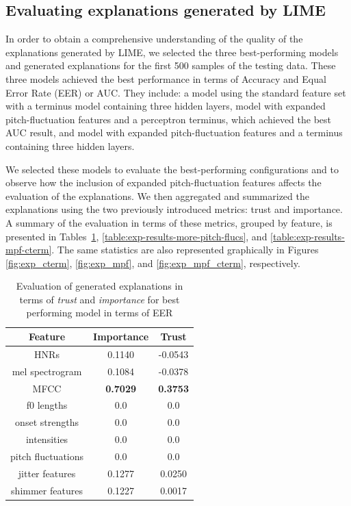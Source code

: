 \documentclass{article}
\begin{document}
            
\subsection{Evaluating explanations generated by LIME}
In order to obtain a comprehensive understanding of the quality of the explanations generated by LIME, we selected the three best-performing models and generated explanations for the first 500 samples of the testing data. These three models achieved the best performance in terms of Accuracy and Equal Error Rate (EER) or AUC. They include: a model using the standard feature set with a terminus model containing three hidden layers, model with expanded pitch-fluctuation features and a perceptron terminus, which achieved the best AUC result, and model with expanded pitch-fluctuation features and a terminus containing three hidden layers.

We selected these models to evaluate the best-performing configurations and to observe how the inclusion of expanded pitch-fluctuation features affects the evaluation of the explanations. We then aggregated and summarized the explanations using the two previously introduced metrics: trust and importance. A summary of the evaluation in terms of these metrics, grouped by feature, is presented in Tables~\ref{table:exp-results-cterm}, \ref{table:exp-results-more-pitch-flucs}, and \ref{table:exp-results-mpf-cterm}. The same statistics are also represented graphically in Figures \ref{fig:exp_cterm}, \ref{fig:exp_mpf}, and \ref{fig:exp_mpf_cterm}, respectively.
\begin{table}[htbp]
	\caption{Evaluation of generated explanations in terms of \textit{trust} and \textit{importance} for best performing model in terms of EER}
			\vspace{10pt}
			\centering
			\begin{tabular}{|c | c | c|}
				\hline
				\textbf{Feature} & \textbf{Importance} & \textbf{Trust} \\
				\hline
				HNRs & 0.1140 & -0.0543 \\  \hline
				mel spectrogram & 0.1084 & -0.0378 \\ \hline
				MFCC & \textbf{0.7029} & \textbf{0.3753} \\ \hline
				f0 lengths & 0.0 & 0.0 \\ \hline
				onset strengths & 0.0 & 0.0 \\ \hline
				intensities & 0.0 & 0.0 \\ \hline
				pitch fluctuations & 0.0 & 0.0 \\ \hline
				jitter features & 0.1277 & 0.0250 \\ \hline
				shimmer features & 0.1227 & 0.0017 \\ \hline
			\end{tabular}
			\label{table:exp-results-cterm}
		\end{table}
		
\end{document}
